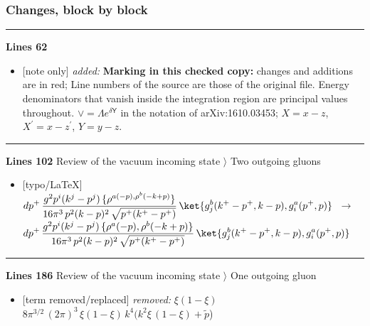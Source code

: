 \documentclass[10pt]{article}
\begin{document}
\subsubsection*{Changes, block by block}
\noindent\rule{\linewidth}{0.3pt}\par\noindent\textbf{Lines 62}\par
\begin{itemize}[leftmargin=2.2em,itemsep=1pt,topsep=2pt]
\item[\textbf{l.62}] \textsf{\small [note only]} \emph{added:} \textbf{Marking in this checked copy:} changes and additions are in red;  Line numbers of the source are those of the original file. Energy denominators that vanish inside the integration region are principal values throughout. $\vee=\Lambda e^{\delta\mathsf{Y}}$ in the notation of arXiv:1610.03453; $X=x-z$, $X^{\prime}=x-z^{\prime}$, $Y=y-z$.
\end{itemize}
\noindent\rule{\linewidth}{0.3pt}\par\noindent\textbf{Lines 102} \quad \textsf{Review of the vacuum incoming state $\rangle$ Two outgoing gluons} \par
\begin{itemize}[leftmargin=2.2em,itemsep=1pt,topsep=2pt]
\item[\textbf{l.102}] \textsf{\small [typo/LaTeX]} $\displaystyle dp^{+}\, \frac{g^{2}p^{i}(k^{j}-p^{j})\,\{\rho^{a(-p),\rho^{b}(-k+p)}\}}{16\pi^{3}\,p^{2}(k-p)^{2}\, \sqrt{p^{+}(k^{+}-p^{+})}}\, \ket{g^{b}_{j}(k^{+}-p^{+}, k-p),g^{a}_{i}(p^{+},p)}$\ $\longrightarrow$\ $\displaystyle dp^{+}\, \frac{g^{2}p^{i}(k^{j}-p^{j})\,\{\rho^{a}(-p),\rho^{b}(-k+p)\}}{16\pi^{3}\,p^{2}(k-p)^{2}\, \sqrt{p^{+}(k^{+}-p^{+})}}\, \ket{g^{b}_{j}(k^{+}-p^{+}, k-p),g^{a}_{i}(p^{+},p)}$
\end{itemize}
\noindent\rule{\linewidth}{0.3pt}\par\noindent\textbf{Lines 186} \quad \textsf{Review of the vacuum incoming state $\rangle$ One outgoing gluon} \par
\begin{itemize}[leftmargin=2.2em,itemsep=1pt,topsep=2pt]
\item[\textbf{l.186}] \textsf{\small [term removed/replaced]} \emph{removed:} $\displaystyle \xi(1-\xi)$$\displaystyle 8\pi^{3/2}\,(2\pi)^{3}\, \xi(1-\xi)\,k^{4}(k^{2}\xi\,(1-\xi)+\tilde{p}${\color{gray}\small)}
\end{itemize}
\end{document}
